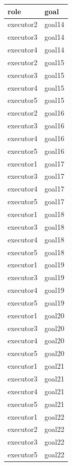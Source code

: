\documentclass[12pt]{article}
\begin{document}
\begin{table}[H]
\centering
{}
\begin{tabular}{|l|l|}
\hline
\textbf{role} & \textbf{goal} \\ \hline
executor2 & goal14 \\ \hline
executor3 & goal14 \\ \hline
executor4 & goal14 \\ \hline
executor2 & goal15 \\ \hline
executor3 & goal15 \\ \hline
executor4 & goal15 \\ \hline
executor5 & goal15 \\ \hline
executor2 & goal16 \\ \hline
executor3 & goal16 \\ \hline
executor4 & goal16 \\ \hline
executor5 & goal16 \\ \hline
executor1 & goal17 \\ \hline
executor3 & goal17 \\ \hline
executor4 & goal17 \\ \hline
executor5 & goal17 \\ \hline
executor1 & goal18 \\ \hline
executor3 & goal18 \\ \hline
executor4 & goal18 \\ \hline
executor5 & goal18 \\ \hline
executor1 & goal19 \\ \hline
executor3 & goal19 \\ \hline
executor4 & goal19 \\ \hline
executor5 & goal19 \\ \hline
executor1 & goal20 \\ \hline
executor3 & goal20 \\ \hline
executor4 & goal20 \\ \hline
executor5 & goal20 \\ \hline
executor1 & goal21 \\ \hline
executor3 & goal21 \\ \hline
executor4 & goal21 \\ \hline
executor5 & goal21 \\ \hline
executor1 & goal22 \\ \hline
executor2 & goal22 \\ \hline
executor3 & goal22 \\ \hline
executor5 & goal22 \\ \hline

\end{tabular}
\end{table}
\end{document}
